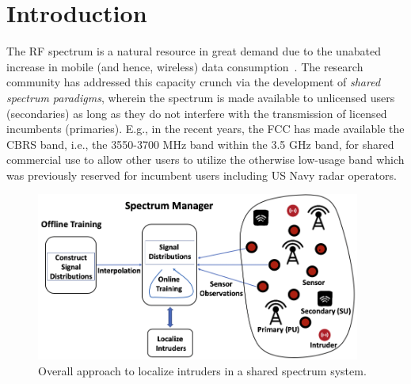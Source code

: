 \section{Introduction}
\label{sec:ipsn-intro}

The RF spectrum is a natural resource in great demand due to the
unabated increase in mobile (and hence, wireless) data
consumption~\cite{Jeffrey14}.  The research community has
addressed this capacity crunch via the development of {\em shared spectrum
  paradigms}, wherein the spectrum is made available to unlicensed
users (secondaries) as long as they do not interfere with the
transmission of licensed incumbents (primaries).  E.g., in the recent
years, the FCC has made available the CBRS band, i.e., the 3550-3700
MHz band within the 3.5 GHz band, for shared commercial use to allow
other users to utilize the otherwise low-usage band which was
previously reserved for incumbent users including US Navy radar
operators.


\begin{figure}[t]
\centering
\includegraphics[width=0.95\textwidth]{chapters/ipsn/figures/architecture.png}
\caption{Overall approach to localize intruders in a shared spectrum system.} 
\label{fig:ipsn-illustration}
\end{figure}

